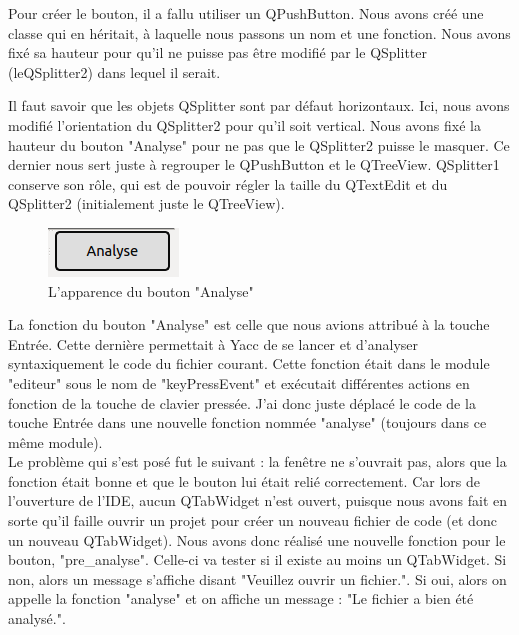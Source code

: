 \documentclass[a4paper,12pt]{article}
\begin{document}
Pour créer le bouton, il a fallu utiliser un QPushButton. Nous avons créé une classe qui en héritait, à laquelle nous passons un nom et une fonction. Nous avons fixé sa hauteur pour qu'il ne puisse pas être modifié par le QSplitter (leQSplitter2) dans lequel il serait.

Il faut savoir que les objets QSplitter sont par défaut horizontaux. Ici, nous avons modifié l'orientation du QSplitter2 pour qu'il soit vertical. Nous avons fixé la hauteur du bouton "Analyse" pour ne pas que le QSplitter2 puisse le masquer. Ce dernier nous sert juste à regrouper le QPushButton et le QTreeView. QSplitter1 conserve son rôle, qui est de pouvoir régler la taille du QTextEdit et du QSplitter2 (initialement juste le QTreeView).\\

\begin{figure}
	\begin{center}
		\includegraphics[scale=0.5]{images/bouton_1.png}
	\end{center}
	\caption{L'apparence du bouton "Analyse"}
\end{figure}

La fonction du bouton "Analyse" est celle que nous avions attribué à la touche Entrée. Cette dernière permettait à Yacc de se lancer et d'analyser syntaxiquement le code du fichier courant. Cette fonction était dans le module "editeur" sous le nom de "keyPressEvent" et exécutait différentes actions en fonction de la touche de clavier pressée. J'ai donc juste déplacé le code de la touche Entrée dans une nouvelle fonction nommée "analyse" (toujours dans ce même module).\\

Le problème qui s'est posé fut le suivant : la fenêtre ne s'ouvrait pas, alors que la fonction était bonne et que le bouton lui était relié correctement. Car lors de l'ouverture de l'IDE, aucun QTabWidget n'est ouvert, puisque nous avons fait en sorte qu'il faille ouvrir un projet pour créer un nouveau fichier de code (et donc un nouveau QTabWidget). Nous avons donc réalisé une nouvelle fonction pour le bouton, "pre\_analyse". Celle-ci va tester si il existe au moins un QTabWidget. Si non, alors un message s'affiche disant "Veuillez ouvrir un fichier.". Si oui, alors on appelle la fonction "analyse" et on affiche un message : "Le fichier a bien été analysé.".\\
\end{document}
